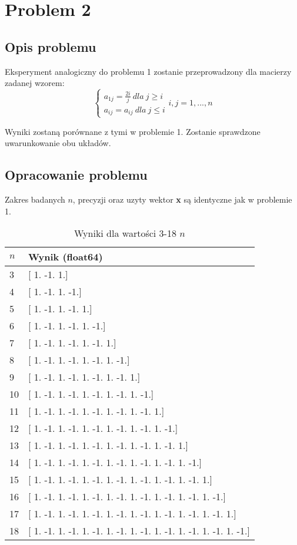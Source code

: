 \documentclass{article}
\begin{document}
\section{Problem 2}
\subsection{Opis problemu}
Eksperyment analogiczny do problemu 1 zostanie przeprowadzony dla macierzy zadanej wzorem:
$$
\begin{cases}
    a_{1j}=\frac{2i}{j} \ dla \ j \ge i\\
    a_{ij}=a_{ij} \ dla \ j \le i
\end{cases}i,j=1,...,n
$$

Wyniki zostaną porównane z tymi w problemie 1. Zostanie sprawdzone uwarunkowanie obu układów.

\subsection{Opracowanie problemu}
Zakres badanych $n$, precyzji oraz uzyty wektor \textbf{x} są identyczne jak w problemie 1.
\begin{table}[H]
\centering
\begin{tabular}{|l|l|}
\hline
$n$ & Wynik (float64) \\ \hline
3 & [ 1. -1.  1.] \\ \hline
4 & [ 1. -1.  1. -1.] \\ \hline
5 & [ 1. -1.  1. -1.  1.] \\ \hline
6 & [ 1. -1.  1. -1.  1. -1.] \\ \hline
7 & [ 1. -1.  1. -1.  1. -1.  1.] \\ \hline
8 & [ 1. -1.  1. -1.  1. -1.  1. -1.] \\ \hline
9 & [ 1. -1.  1. -1.  1. -1.  1. -1.  1.] \\ \hline
10 & [ 1. -1.  1. -1.  1. -1.  1. -1.  1. -1.] \\ \hline
11 & [ 1. -1.  1. -1.  1. -1.  1. -1.  1. -1.  1.] \\ \hline
12 & [ 1. -1.  1. -1.  1. -1.  1. -1.  1. -1.  1. -1.] \\ \hline
13 & [ 1. -1.  1. -1.  1. -1.  1. -1.  1. -1.  1. -1.  1.] \\ \hline
14 & [ 1. -1.  1. -1.  1. -1.  1. -1.  1. -1.  1. -1.  1. -1.] \\ \hline
15 & [ 1. -1.  1. -1.  1. -1.  1. -1.  1. -1.  1. -1.  1. -1.  1.] \\ \hline
16 & [ 1. -1.  1. -1.  1. -1.  1. -1.  1. -1.  1. -1.  1. -1.  1. -1.] \\ \hline
17 & [ 1. -1.  1. -1.  1. -1.  1. -1.  1. -1.  1. -1.  1. -1.  1. -1.  1.] \\ \hline
18 & [ 1. -1.  1. -1.  1. -1.  1. -1.  1. -1.  1. -1.  1. -1.  1. -1.  1. -1.] \\ \hline
\end{tabular}
\caption{Wyniki dla wartości 3-18 $n$}
\end{table}
\end{document}
